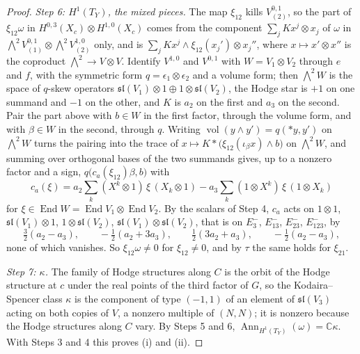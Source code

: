 \documentclass[11pt,reqno]{amsart}
\theoremstyle{plain}
\theoremstyle{definition}
\theoremstyle{remark}
\newcommand{\CC}{\mathbb{C}}
\DeclareMathOperator{\End}{End}
\DeclareMathOperator{\Ann}{Ann}
\begin{document}
\begin{proof}
\emph{Step 6: $H^{1}(T_{Y})$, the mixed pieces.} The map $\xi_{12}$ kills
$V^{0,1}_{(2)}$, so the part of $\xi_{12}\omega$ in $H^{0,3}(X_{c})\otimes
H^{1,0}(X_{c})$ comes from the component $\sum_{j}Kx^{j}\otimes x_{j}$ of
$\omega$ in ${\textstyle\bigwedge^{2}}V^{0,1}_{(1)}\otimes{\textstyle\bigwedge^{2}}
V^{1,0}_{(2)}$ only, and is $\sum_{j}Kx^{j}\wedge\xi_{12}(x_{j}')\otimes
x_{j}''$, where $x\mapsto x'\otimes x''$ is the coproduct
${\textstyle\bigwedge^{2}}\to V\otimes V$. Identify $V^{1,0}$ and $V^{0,1}$
with $W=V_{1}\otimes V_{2}$ through $e$ and $f$, with the symmetric form
$q=\epsilon_{1}\otimes\epsilon_{2}$ and a volume form; then
${\textstyle\bigwedge^{2}}W$ is the space of $q$-skew operators
$\mathfrak{sl}(V_{1})\otimes1\oplus1\otimes\mathfrak{sl}(V_{2})$, the Hodge
star is $+1$ on one summand and $-1$ on the other, and $K$ is $a_{2}$ on the
first and $a_{3}$ on the second. Pair the part above with $b\in W$ in the
first factor, through the volume form, and with $\beta\in W$ in the second,
through $q$. Writing $\operatorname{vol}(y\wedge y')=q(\ast y,y')$ on
${\textstyle\bigwedge^{2}}W$ turns the pairing into the trace of
$x\mapsto K\ast\bigl(\xi_{12}(\iota_{\beta}x)\wedge b\bigr)$ on
${\textstyle\bigwedge^{2}}W$, and summing over orthogonal bases of the two
summands gives, up to a nonzero factor and a sign,
$q\bigl(c_{a}(\xi_{12})\beta,b\bigr)$ with
\[
  c_{a}(\xi)=a_{2}\sum_{k}(X^{k}\otimes1)\,\xi\,(X_{k}\otimes1)
  -a_{3}\sum_{k}(1\otimes X^{k})\,\xi\,(1\otimes X_{k})
\]
for $\xi\in\End W=\End V_{1}\otimes\End V_{2}$.
By the scalars of Step 4, $c_{a}$ acts on $1\otimes1$, $\mathfrak{sl}(V_{1})
\otimes1$, $1\otimes\mathfrak{sl}(V_{2})$, $\mathfrak{sl}(V_{1})\otimes
\mathfrak{sl}(V_{2})$, that is on $E_{3}^{-}$, $E_{13}^{-}$, $E_{23}^{-}$,
$E_{123}^{-}$, by
\[
  \tfrac32(a_{2}-a_{3}),\qquad
  -\tfrac12(a_{2}+3a_{3}),\qquad
  \tfrac12(3a_{2}+a_{3}),\qquad
  -\tfrac12(a_{2}-a_{3}),
\]
none of which vanishes. So $\xi_{12}\omega\ne0$ for $\xi_{12}\ne0$, and by
$\tau$ the same holds for $\xi_{21}$.

\emph{Step 7: $\kappa$.} The family of Hodge structures along $C$ is the
orbit of the Hodge structure at $c$ under the real points of the third factor
of $G$, so the Kodaira--Spencer class $\kappa$ is the component of type
$(-1,1)$ of an element of $\mathfrak{sl}(V_{3})$ acting on both copies of $V$,
a nonzero multiple of $(N,N)$; it is nonzero because the Hodge structures
along $C$ vary. By Steps 5 and 6, $\Ann_{H^{1}(T_{Y})}(\omega)=\CC\kappa$.
With Steps 3 and 4 this proves (i) and (ii).


\end{proof}
\end{document}
